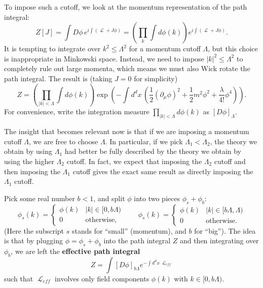 \documentclass{report}
\theoremstyle{plain}
\theoremstyle{definition}
\theoremstyle{remark}
\DeclareMathOperator{\cL}{\mathcal{L}}
\begin{document}
To impose such a cutoff, we look at the momentum representation of the
path integral:
$$ Z[J] = \int D\phi \, e^{i\int(\cL + J\phi)} = \left(\prod_k \int d\phi(k)\right) e^{i\int(\cL + J\phi)}. $$
It is tempting to integrate over $k^2 \le \Lambda^2$ for a momentum
cutoff $\Lambda$, but this choice is inappropriate in Minkowski space.
Instead, we need to impose $|k|^2 \le \Lambda^2$ to completely rule
out large momenta, which means we must also Wick rotate the path
integral. The result is (taking $J = 0$ for simplicity)
$$ Z = \left(\prod_{|k| < \Lambda} \int d\phi(k)\right) \exp\left(-\int d^dx \, \left(\frac{1}{2}(\partial_\mu\phi)^2 + \frac{1}{2}m^2\phi^2 + \frac{\lambda}{4!} \phi^4\right)\right). $$
For convenience, write the integration measure
$\prod_{|k| < \Lambda} d\phi(k)$ as $[D\phi]_\Lambda$.

The insight that becomes relevant now is that if we are imposing a
momentum cutoff $\Lambda$, we are free to choose $\Lambda$. In
particular, if we pick $\Lambda_1 < \Lambda_2$, the theory we obtain
by using $\Lambda_1$ had better be fully described by the theory we
obtain by using the higher $\Lambda_2$ cutoff. In fact, we expect that
imposing the $\Lambda_2$ cutoff and then imposing the $\Lambda_1$
cutoff gives the exact same result as directly imposing the
$\Lambda_1$ cutoff.

Pick some real number $b < 1$, and split $\phi$ into two pieces
$\phi_s + \phi_b$:
$$ \phi_s(k) = \begin{cases} \phi(k) & |k| \in [0, b\Lambda) \\ 0 & \text{otherwise}, \end{cases} \qquad \phi_s(k) = \begin{cases} \phi(k) & |k| \in [b\Lambda, \Lambda) \\ 0 & \text{otherwise}. \end{cases} $$
(Here the subscript $s$ stands for ``small'' (momentum), and $b$ for
``big''). The idea is that by plugging $\phi = \phi_s + \phi_b$ into
the path integral $Z$ and then integrating over $\phi_b$, we are left
the {\bf effective path integral}
$$ Z = \int [D\phi]_{b\Lambda} e^{-\int d^dx \, \cL_{eff}} $$
such that $\cL_{eff}$ involves only field components $\phi(k)$ with
$k \in [0, b\Lambda)$.
\end{document}
